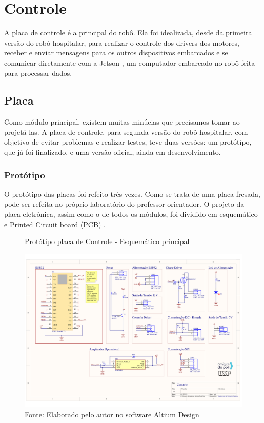 \documentclass[../poliXuniversity_hospital_-USP-report.tex]{subfiles}
\begin{document}
\clearpage
\section{Controle}

A placa de controle é a principal do robô. Ela foi idealizada, desde da primeira versão do robô hospitalar, para realizar o controle dos drivers dos motores, receber e enviar mensagens para os outros dispositivos embarcados e se comunicar diretamente com a Jetson \cite{jetson21}, um computador embarcado no robô feita para processar dados.

\subsection{Placa}

Como módulo principal, existem muitas minúcias que precisamos tomar ao projetá-las. A placa de controle, para segunda versão do robô hospitalar, com objetivo de evitar problemas e realizar testes, teve duas versões: um protótipo, que já foi finalizado, e uma versão oficial, ainda em desenvolvimento. 

\subsubsection{Protótipo}

O protótipo das placas foi refeito três vezes. Como se trata de uma placa fresada, pode ser refeita no próprio laboratório do professor orientador. O projeto da placa eletrônica, assim como o de todos os módulos, foi dividido em esquemático e Printed Circuit board (PCB) . 

\begin{figure}[!h]
\centering
    \caption{Protótipo placa de Controle - Esquemático principal }
    \centering %
    \includegraphics[width=17cm]{modulos/Controle_Motor-1.png}
    \caption*{Fonte: Elaborado pelo autor no software Altium Design\cite{altium21} }
    \label{Protótipo placa de ## - Esquemático principal}
\end{figure}
\end{document}
